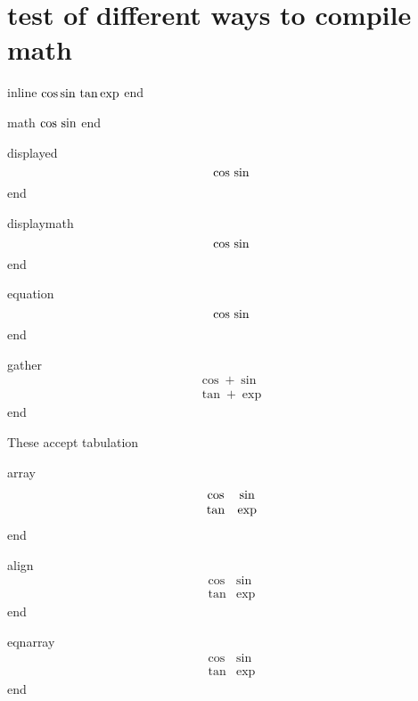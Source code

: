 
\section{test of different ways to compile math}

inline
$
   \cos  \sin \\ \tan  \exp
$
end

math
\begin{math}
  \cos \\ \sin
\end{math}
end

displayed
\[
  \cos\\ \sin 
\]
end


displaymath
\begin{displaymath}
  \cos\\ \sin
\end{displaymath}
end


equation
\begin{equation}
  \cos\\ \sin
\end{equation}
end

gather
\begin{gather}
   \cos + \sin \\ \tan + \exp
\end{gather}
end

These accept tabulation

array
\[\begin{array}[h]{cc}
  \cos & \sin \\ \tan & \exp
\end{array}\]
end

align
\begin{align}
  \cos & \sin \\ \tan & \exp
\end{align}
end


eqnarray
\begin{eqnarray}
  \label{eq:adff}
  \cos & \sin \\ \tan & \exp
\end{eqnarray}
end




